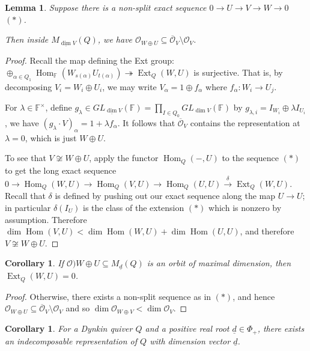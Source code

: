 \documentclass{book}
\newtheorem{lemma}[theorem]{Lemma}
\newtheorem{corollary}[theorem]{Corollary}
\DeclareMathOperator{\Hom}{Hom}
\DeclareMathOperator{\Ext}{Ext}
\begin{document}
\begin{lemma}
Suppose there is a non-split exact sequence $0 \to U \to V \to W \to 0$ $(\ast)$.

Then inside $M_{\underline \dim V} (Q)$, we have $\mathcal O_{W \oplus U} \subseteq \overline {\mathcal{O}}_V \setminus \mathcal O_V$.
\end{lemma}

\begin{proof}
Recall the map defining the Ext group: $\oplus_{\alpha \in Q_1} \Hom_{\mathbb F} (W_{s(\alpha)} U_{t(\alpha)}) \twoheadrightarrow \Ext_Q(W,U)$ is surjective. That is, by decomposing $V_i = W_i \oplus U_i$, we may write $V_\alpha = 1 \oplus f_\alpha$ where $f_\alpha: W_i \to U_j$.

For $\lambda \in \mathbb F^\times$, define $g_\lambda \in GL_{\underline \dim V} (\mathbb F) = \prod_{I \in Q_0} GL_{\dim V}(\mathbb F)$ by $g_{\lambda, i} = I_{W_i} \oplus \lambda I_{U_i}$, we have $(g_\lambda \cdot V)_\alpha = 1 +\lambda f_\alpha$. It follows that $\overline {\mathcal{O}}_V$ contains the representation at $\lambda=0$, which is just $W \oplus U$.

To see that $V \not \cong W \oplus U$, apply the functor $\Hom_Q(-,U)$ to the sequence $(\ast)$ to get the long exact sequence $0 \to \Hom_Q(W,U) \to \Hom_Q(V,U) \to \Hom_Q(U,U) \overset \delta \to \Ext_Q(W,U)$. Recall that $\delta$ is defined by pushing out our exact sequence along the map $U \to U$; in particular $\delta(I_U)$ is the class of the extension $(\ast)$ which is nonzero by assumption. Therefore $\dim \Hom(V,U) < \dim \Hom(W,U) + \dim \Hom(U,U)$, and therefore $V \not \cong W \oplus U$.
\end{proof}

\begin{corollary}
If $\mathcal O){W \oplus U} \subseteq M_{\underline d}(Q)$ is an orbit of maximal dimension, then $\Ext_Q(W,U) = 0$.
\end{corollary}

\begin{proof} Otherwise, there exists a non-split sequence as in $(\ast)$, and hence $\mathcal O_{W \oplus U} \subseteq \overline {\mathcal O}_V \setminus \mathcal O_V$ and so $\dim \mathcal O_{W \oplus V} < \dim \mathcal O_V$.
\end{proof}

\begin{corollary}\label{cor:dynkin-root-dim-ind}
For a Dynkin quiver $Q$ and a positive real root $\underline d \in \Phi_+$, there exists an indecomposable representation of $Q$ with dimension vector $\underline d$.
\end{corollary}
\end{document}
